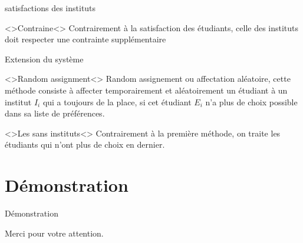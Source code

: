 \documentclass[10pt,handout]{beamer}
\begin{document}
\begin{frame}{satisfactions des instituts}
    \begin{block}<>{Contraine}<>
        Contrairement à la satisfaction des étudiants, celle des instituts doit respecter une contrainte supplémentaire
    \end{block}
\end{frame}

\begin{frame}{Extension du système}
    \begin{block}<>{Random assignment}<>
        Random assignement ou affectation aléatoire, cette méthode consiste à affecter temporairement et aléatoirement un étudiant à un institut $I_i$ qui a toujours de la place, si cet étudiant $E_i$ n’a plus de choix possible dans sa liste de préférences.
    \end{block}

    \begin{block}<>{Les sans instituts}<>
        Contrairement à la première méthode, on traite les étudiants qui n’ont plus de choix en dernier.
    \end{block}
\end{frame}


\section{Démonstration}


\begin{frame}{Démonstration}
    \begin{center}
      Merci pour votre attention.
    \end{center}
\end{frame}
  
\end{document}

